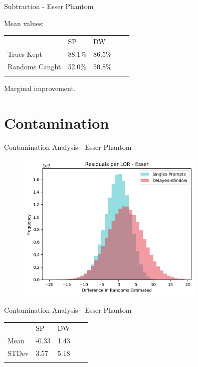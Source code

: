\documentclass[pdf]{beamer}
\begin{document}
\begin{frame}{Subtraction - Esser Phantom}

    Mean values:
    \begin{table}[]
        \begin{tabular}{lllll}
        \multicolumn{1}{l|}{}               & SP     & DW     &  &  \\ \cline{1-3}
        \multicolumn{1}{l|}{Trues Kept}     & 88.1\% & 86.5\% &  &  \\
        \multicolumn{1}{l|}{Randoms Caught} & 52.0\% & 50.8\% &  &  \\
                                            &        &        &  & 
        \end{tabular}
    \end{table}

    Marginal improvement.
\end{frame}


\section{Contamination}

\begin{frame}{Contamination Analysis - Esser Phantom}
    \begin{figure}
        \centering
        \includegraphics[width=0.8\textwidth]{figures/esserdiff.png}
    \end{figure}
\end{frame}

\begin{frame}{Contamination Analysis - Esser Phantom}
    \begin{table}
        \begin{tabular}{lllll}
        \multicolumn{1}{l|}{}               & SP     & DW     &  &  \\ \cline{1-3}
        \multicolumn{1}{l|}{Mean}     & -0.33 & 1.43 &  &  \\
        \multicolumn{1}{l|}{STDev} & 3.57 & 5.18 &  &  \\
                                            &        &        &  & 
        \end{tabular}
    \end{table}
\end{frame}
\end{document}
